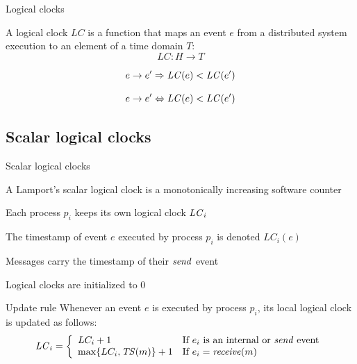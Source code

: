 \begin{frame}{Logical clocks}

\begin{definition}
A logical clock $LC$ is a function that maps an event $e$ from a distributed 
system execution to an element of a time domain $T$:
\[
  LC: H \rightarrow T
\]
\end{definition}

\begin{definition}

\[ e \rightarrow e' \Rightarrow \mathit{LC}(e) < \mathit{LC}(e')  \]

\end{definition}

\begin{definition}

\[ e \rightarrow e' \Leftrightarrow \mathit{LC}(e) < \mathit{LC}(e')  \]

\end{definition}

\end{frame}


\subsection{Scalar logical clocks}

\begin{frame}{Scalar logical clocks}

\begin{definition}
\BI
\item A Lamport's \alert{scalar} logical clock is a monotonically increasing software counter
\item Each process $p_i$ keeps its own logical clock $\mathit{LC}_i$
\item The \alert{timestamp} of event $e$ executed by process $p_i$ is denoted $LC_i(e)$
\item Messages carry the \alert{timestamp} of their $\mathit{send}$ event
\item Logical clocks are initialized to 0
\EI
\end{definition}

% 

\begin{block}{Update rule}
Whenever an event $e$ is executed by process $p_i$, its local logical clock is updated
as follows:
\[
\mathit{LC}_i = \left\{ 
  \begin{array}{ll}
     LC_i + 1  & \mbox{If $e_i$ is an internal or $\mathit{send}$ event} \\
     \max \{ LC_i, \mathit{TS}(m) \} + 1 & \mbox{If $e_i = \mathit{receive}(m)$}
  \end{array} 
\right.
\]
\end{block}
\end{frame}

